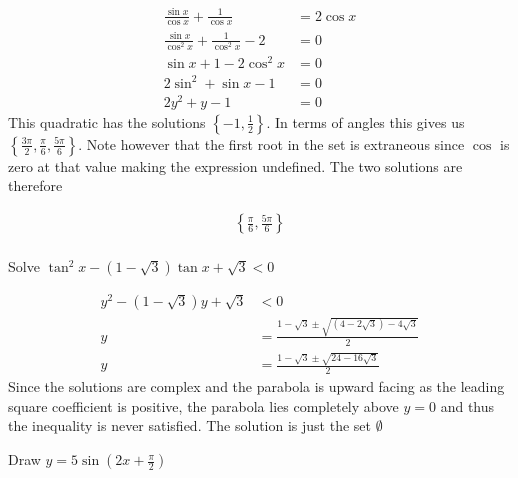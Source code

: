 \documentclass{article}
\begin{document}
\begin{align*}
	\frac{\sin x}{\cos x} + \frac{1}{\cos x} &= 2\cos x \\
	\frac{\sin x}{\cos^2 x} + \frac{1}{\cos ^2 x} - 2 &= 0 \\
	\sin x + 1 -2\cos^2 x &= 0 \\
	2\sin^2 + \sin x - 1 &= 0 \\
	2y^2 + y -1 &= 0
\end{align*}
This quadratic has the solutions \(\left\{-1, \frac{1}{2}\right\}\). In terms of angles this gives us \(\left\{\frac{3\pi}{2}, \frac{\pi}{6}, \frac{5\pi}{6}\right\}\). Note however that the first root in the set is extraneous since \(\cos\) is zero at that value making the expression undefined. The two solutions are therefore

\begin{align*}
	\left\{\frac{\pi}{6}, \frac{5\pi}{6}\right\} \\
\end{align*}

\begin{question}
	Solve \(\tan^2 x- (1-\sqrt{3})\tan x + \sqrt{3} < 0\)
\end{question}

\begin{align*}
	y^2 - (1 - \sqrt{3})y + \sqrt{3} &< 0 \\
	y &= \frac{1 - \sqrt{3} \pm \sqrt{(4-2\sqrt{3}) -4\sqrt{3}}}{2} \\
	y &= \frac{1 - \sqrt{3} \pm \sqrt{24 - 16\sqrt{3}}}{2}
\end{align*}
Since the solutions are complex and the parabola is upward facing as the leading square coefficient is positive, the parabola lies completely above \(y = 0\) and thus the inequality is never satisfied. The solution is just the set \(\emptyset\)

\begin{question}
	Draw \(y = 5\sin \left(2x + \frac{\pi}{2}\right)\)
\end{question}

\begin{center}
\end{center}
\end{document}
